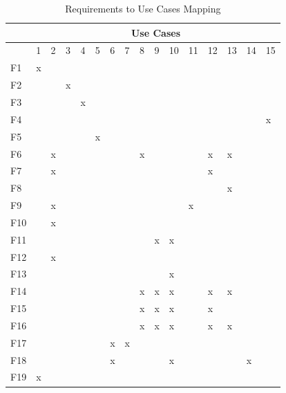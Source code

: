 \begin{table}[hbt!]
    \centering
    \captionsetup{justification=centering}
    \begin{tabular}{|l|l|l|l|l|l|l|l|l|l|l|l|l|l|l|l|}
        \hline
        & \multicolumn{15}{c|}{Use Cases} \\ \hline
        & 1 & 2 & 3 & 4 & 5 & 6 & 7 & 8 & 9 & 10 & 11 & 12 & 13 & 14 & 15 \\ \hline
        F1  & x &   &   &   &   &   &   &   &   &    &    &    &    &    &    \\ \hline
        F2  &   &   & x &   &   &   &   &   &   &    &    &    &    &    &    \\ \hline
        F3  &   &   &   & x &   &   &   &   &   &    &    &    &    &    &    \\ \hline
        F4  &   &   &   &   &   &   &   &   &   &    &    &    &    &    & x  \\ \hline
        F5  &   &   &   &   & x &   &   &   &   &    &    &    &    &    &    \\ \hline
        F6  &   & x &   &   &   &   &   & x &   &    &    & x  & x  &    &    \\ \hline
        F7  &   & x &   &   &   &   &   &   &   &    &    & x  &    &    &    \\ \hline
        F8  &   &   &   &   &   &   &   &   &   &    &    &    & x  &    &    \\ \hline
        F9  &   & x &   &   &   &   &   &   &   &    & x  &    &    &    &    \\ \hline
        F10 &   & x &   &   &   &   &   &   &   &    &    &    &    &    &    \\ \hline
        F11 &   &   &   &   &   &   &   &   & x & x  &    &    &    &    &    \\ \hline
        F12 &   & x &   &   &   &   &   &   &   &    &    &    &    &    &    \\ \hline
        F13 &   &   &   &   &   &   &   &   &   & x  &    &    &    &    &    \\ \hline
        F14 &   &   &   &   &   &   &   & x & x & x  &    & x  & x  &    &    \\ \hline
        F15 &   &   &   &   &   &   &   & x & x & x  &    & x  &    &    &    \\ \hline
        F16 &   &   &   &   &   &   &   & x & x & x  &    & x  & x  &    &    \\ \hline
        F17 &   &   &   &   &   & x & x &   &   &    &    &    &    &    &    \\ \hline
        F18 &   &   &   &   &   & x &   &   &   & x  &    &    &    & x  &    \\ \hline
        F19 & x &   &   &   &   &   &   &   &   &    &    &    &    &    &    \\ \hline
    \end{tabular}
    \caption{Requirements to Use Cases Mapping}
    \label{tab:use_cases}
\end{table}